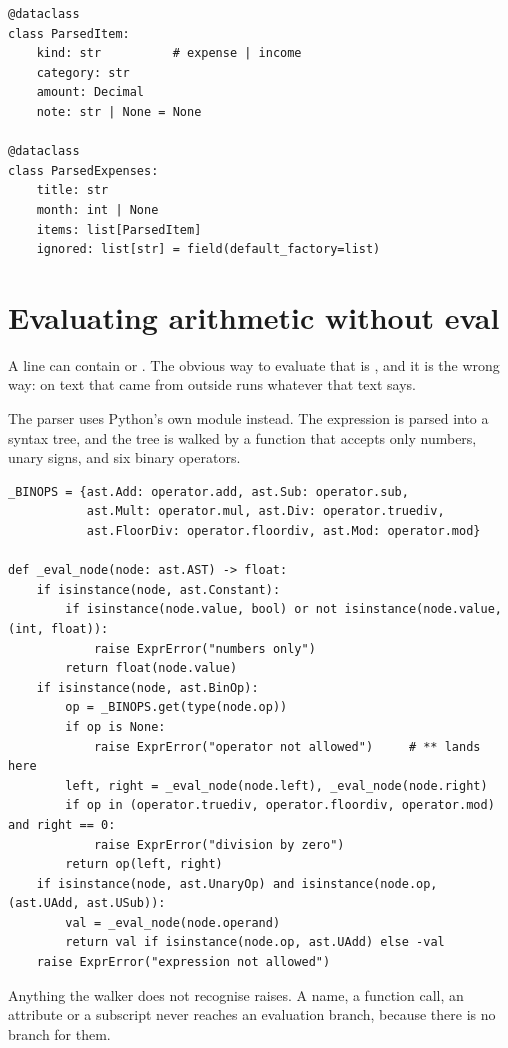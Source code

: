 \begin{lstlisting}[style=py]
@dataclass
class ParsedItem:
    kind: str          # expense | income
    category: str
    amount: Decimal
    note: str | None = None

@dataclass
class ParsedExpenses:
    title: str
    month: int | None
    items: list[ParsedItem]
    ignored: list[str] = field(default_factory=list)
\end{lstlisting}

\section{Evaluating arithmetic without eval}

A line can contain  or . The obvious way to evaluate
that is , and it is the wrong way:  on text that came
from outside runs whatever that text says.

The parser uses Python's own  module instead. The expression is parsed
into a syntax tree, and the tree is walked by a function that accepts only
numbers, unary signs, and six binary operators.

\begin{lstlisting}[style=py]
_BINOPS = {ast.Add: operator.add, ast.Sub: operator.sub,
           ast.Mult: operator.mul, ast.Div: operator.truediv,
           ast.FloorDiv: operator.floordiv, ast.Mod: operator.mod}

def _eval_node(node: ast.AST) -> float:
    if isinstance(node, ast.Constant):
        if isinstance(node.value, bool) or not isinstance(node.value, (int, float)):
            raise ExprError("numbers only")
        return float(node.value)
    if isinstance(node, ast.BinOp):
        op = _BINOPS.get(type(node.op))
        if op is None:
            raise ExprError("operator not allowed")     # ** lands here
        left, right = _eval_node(node.left), _eval_node(node.right)
        if op in (operator.truediv, operator.floordiv, operator.mod) and right == 0:
            raise ExprError("division by zero")
        return op(left, right)
    if isinstance(node, ast.UnaryOp) and isinstance(node.op, (ast.UAdd, ast.USub)):
        val = _eval_node(node.operand)
        return val if isinstance(node.op, ast.UAdd) else -val
    raise ExprError("expression not allowed")
\end{lstlisting}

Anything the walker does not recognise raises. A name, a function call, an
attribute or a subscript never reaches an evaluation branch, because there is no
branch for them.


